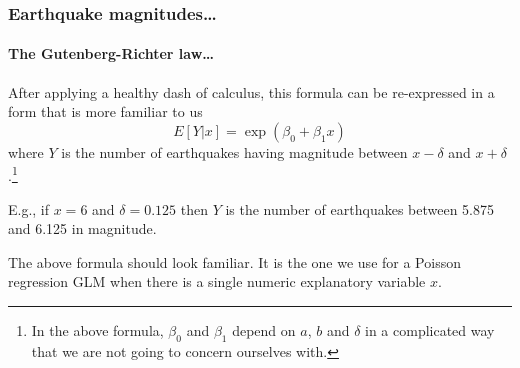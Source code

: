 \documentclass{beamer}\usepackage[]{graphicx}\usepackage[]{xcolor}
\begin{document}
\begin{frame}
\frametitle{Earthquake magnitudes\ldots}
\framesubtitle{The Gutenberg-Richter law\ldots}

After applying a healthy dash of calculus,
this formula can be re-expressed in a form that is more familiar to us
\[ E[Y|x] = \exp(\beta_0 + \beta_1 x) \]
where $Y$ is the number of earthquakes having magnitude between
$x-\delta$ and $x+\delta$.\footnote{
In the above formula, $\beta_0$ and $\beta_1$ depend on $a$, $b$ and $\delta$
in a complicated way that we are not going to concern ourselves with.}

\medskip

E.g., if $x=6$ and $\delta=0.125$ then $Y$ is the number of earthquakes
between 5.875 and 6.125 in magnitude.

\medskip

The above formula should look familiar. It is the one we use for a Poisson regression GLM when there is a single numeric explanatory variable $x$.
\end{frame}
\end{document}
